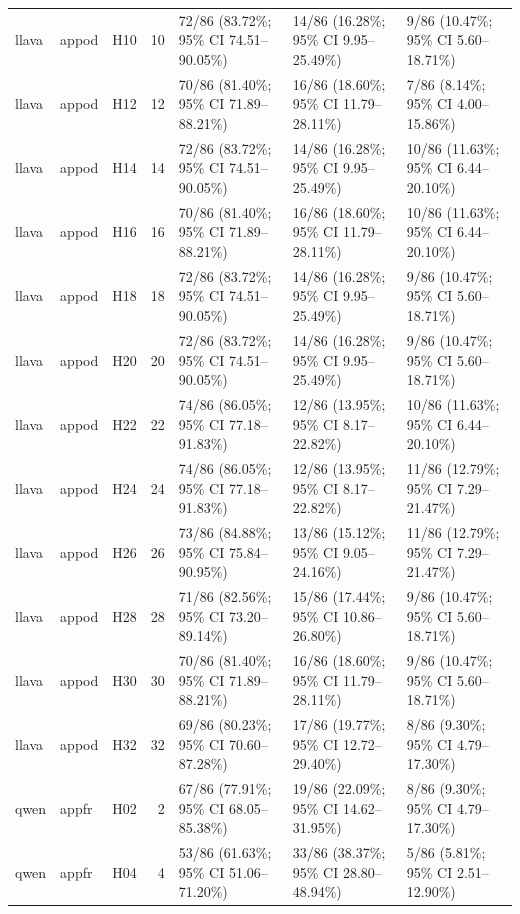 \begin{longtable}{lllrlll}
llava & appod & H10 & 10 & 72/86 (83.72\%; 95\% CI 74.51–90.05\%) & 14/86 (16.28\%; 95\% CI 9.95–25.49\%) & 9/86 (10.47\%; 95\% CI 5.60–18.71\%) \\
llava & appod & H12 & 12 & 70/86 (81.40\%; 95\% CI 71.89–88.21\%) & 16/86 (18.60\%; 95\% CI 11.79–28.11\%) & 7/86 (8.14\%; 95\% CI 4.00–15.86\%) \\
llava & appod & H14 & 14 & 72/86 (83.72\%; 95\% CI 74.51–90.05\%) & 14/86 (16.28\%; 95\% CI 9.95–25.49\%) & 10/86 (11.63\%; 95\% CI 6.44–20.10\%) \\
llava & appod & H16 & 16 & 70/86 (81.40\%; 95\% CI 71.89–88.21\%) & 16/86 (18.60\%; 95\% CI 11.79–28.11\%) & 10/86 (11.63\%; 95\% CI 6.44–20.10\%) \\
llava & appod & H18 & 18 & 72/86 (83.72\%; 95\% CI 74.51–90.05\%) & 14/86 (16.28\%; 95\% CI 9.95–25.49\%) & 9/86 (10.47\%; 95\% CI 5.60–18.71\%) \\
llava & appod & H20 & 20 & 72/86 (83.72\%; 95\% CI 74.51–90.05\%) & 14/86 (16.28\%; 95\% CI 9.95–25.49\%) & 9/86 (10.47\%; 95\% CI 5.60–18.71\%) \\
llava & appod & H22 & 22 & 74/86 (86.05\%; 95\% CI 77.18–91.83\%) & 12/86 (13.95\%; 95\% CI 8.17–22.82\%) & 10/86 (11.63\%; 95\% CI 6.44–20.10\%) \\
llava & appod & H24 & 24 & 74/86 (86.05\%; 95\% CI 77.18–91.83\%) & 12/86 (13.95\%; 95\% CI 8.17–22.82\%) & 11/86 (12.79\%; 95\% CI 7.29–21.47\%) \\
llava & appod & H26 & 26 & 73/86 (84.88\%; 95\% CI 75.84–90.95\%) & 13/86 (15.12\%; 95\% CI 9.05–24.16\%) & 11/86 (12.79\%; 95\% CI 7.29–21.47\%) \\
llava & appod & H28 & 28 & 71/86 (82.56\%; 95\% CI 73.20–89.14\%) & 15/86 (17.44\%; 95\% CI 10.86–26.80\%) & 9/86 (10.47\%; 95\% CI 5.60–18.71\%) \\
llava & appod & H30 & 30 & 70/86 (81.40\%; 95\% CI 71.89–88.21\%) & 16/86 (18.60\%; 95\% CI 11.79–28.11\%) & 9/86 (10.47\%; 95\% CI 5.60–18.71\%) \\
llava & appod & H32 & 32 & 69/86 (80.23\%; 95\% CI 70.60–87.28\%) & 17/86 (19.77\%; 95\% CI 12.72–29.40\%) & 8/86 (9.30\%; 95\% CI 4.79–17.30\%) \\
qwen & appfr & H02 & 2 & 67/86 (77.91\%; 95\% CI 68.05–85.38\%) & 19/86 (22.09\%; 95\% CI 14.62–31.95\%) & 8/86 (9.30\%; 95\% CI 4.79–17.30\%) \\
qwen & appfr & H04 & 4 & 53/86 (61.63\%; 95\% CI 51.06–71.20\%) & 33/86 (38.37\%; 95\% CI 28.80–48.94\%) & 5/86 (5.81\%; 95\% CI 2.51–12.90\%) \\

\end{longtable}
